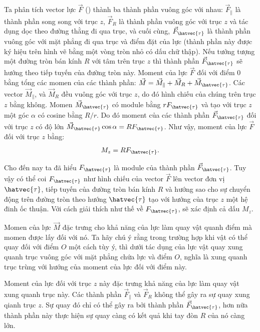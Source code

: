 \noindent
Ta phân tích vector lực $\vec{F}$ () thành ba thành phần vuông góc với nhau: $\vec{F}_{\parallel}$ là thành phần song song với trục $z$, $\vec{F}_R$ là thành phần vuông góc với trục $z$ và tác dụng dọc theo đường thằng đi qua trục, và cuối cùng,  $\vec{F}_{\hatvec{\tau}}$ là thành phần vuông góc với mặt phẳng đi qua trục và điểm đặt của lực (thành phần này được ký hiệu trên hình vẽ bằng một vòng tròn nhỏ có dấu chữ thập). Nếu tưởng tượng một đường tròn bán kính $R$ với tâm trên trục $z$ thì thành phần $\vec{F}_{\hatvec{\tau}}$ sẽ hướng theo tiếp tuyến của đường tròn này. Moment của lực $\vec{F}$ đối với điểm $0$ bằng tổng các momen của các thành phần: $\vec{M}=\vec{M}_{\parallel}+\vec{M}_R+\vec{M}_{\hatvec{\tau}}$. Các vector $\vec{M}_{\parallel}$, và $\vec{M}_R$ đều vuông góc với trục $z$, do đó hình chiếu của chúng trên trục $z$ bằng không. Momen $\vec{M}_{\hatvec{\tau}}$ có module bằng $rF_{\hatvec{\tau}}$ và tạo với trục $z$ một góc $\alpha$ có cosine bằng $R/r$. Do đó moment của các thành phần $\vec{F}_{\hatvec{\tau}}$ đối với trục $z$ có độ lớn $\vec{M}_{\hatvec{\tau}}\cos\alpha=RF_{\hatvec{\tau}}$. Như vậy, moment của lực $\vec{F}$ đối với trục $z$ bằng:
\begin{equation}\label{eq:3_115}
M_z = RF_{\hatvec{\tau}}.
\end{equation}

\noindent
Cho đến nay ta đã hiểu $F_{\hatvec{\tau}}$ là module của thành phần $\vec{F}_{\hatvec{\tau}}$. Tuy vậy có thể coi $F_{\hatvec{\tau}}$ như hình chiếu của vector $\vec{F}$ lên vector đơn vị $\hatvec{\tau}$, tiếp tuyến của đường tròn bán kính $R$ và hướng sao cho sự chuyển động trên đường tròn theo hướng $\hatvec{\tau}$ tạo với hướng của trục $z$ một hệ đinh ốc thuận. Với cách giải thích như thế về  $F_{\hatvec{\tau}}$,  sẽ xác định cả dấu $M_z$.

Momen của lực $\vec{M}$ đặc trưng cho khả năng của lực làm quay vật quanh điểm mà momen được lấy đối với nó. Ta hãy chú ý rằng trong trường hợp khi vật có thể quay đối với điểm $O$ một cách tùy ý, thì dưới tác dụng của lực vật quay xung quanh trục vuông góc với mặt phẳng chứa lực và điểm $O$, nghĩa là xung quanh trục trùng với hướng của moment của lực đối với điểm này.

Moment của lực đối với trục $z$ này đặc trưng khả năng của lực làm quay vật xung quanh trục này. Các thành phần $\vec{F}_{\parallel}$ và $\vec{F}_{R}$ không thể gây ra sự quay xung qianh trục $z$. Sự quay đó chỉ có thể gây ra bởi thành phần $\vec{F}_{\hatvec{\tau}}$, hơn nữa thành phần này thực hiện sự quay càng có kết quả khi tay đòn $R$ của nó càng lớn. 

